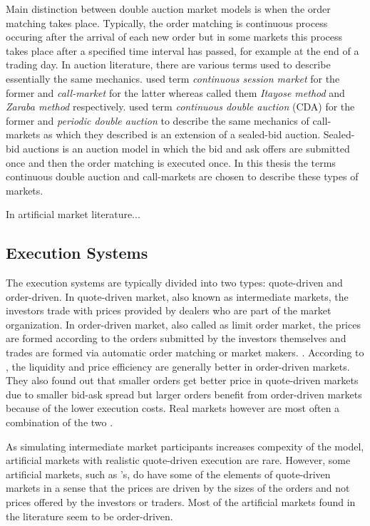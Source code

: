 Main distinction between double auction market models is when
the order matching takes place. Typically, the order matching 
is continuous process occuring after the arrival of each new order but
in some markets this process takes place after a specified time interval
has passed, for example at the end of a trading day. \citep{boer05}
In auction literature, there are various terms used to describe essentially 
the same mechanics. \citet{boer05} used term 
\textit{continuous session market} for the former and \textit{call-market}
for the latter whereas \citet{ASt05} called them \textit{Itayose method}
and \textit{Zaraba method} respectively. \citet{Moc15} used term \textit{continuous 
double auction} (CDA) for the former and \textit{periodic double auction} to describe 
the same mechanics of call-markets as which they described is an extension of 
a sealed-bid auction. Sealed-bid auctions is an auction model in which the bid and ask offers
are submitted once and then the order matching is executed once. In this thesis
the terms continuous double auction and call-markets are chosen to describe
these types of markets.

In artificial market literature...

\subsection{Execution Systems}
The execution systems are typically divided into two types:
quote-driven and order-driven. In quote-driven market, also known
as intermediate markets, the investors trade with prices provided 
by dealers who are part of the market organization. 
In order-driven market, also called as limit order market, 
the prices are formed according to the orders submitted by the 
investors themselves and trades are formed via automatic order matching 
or market makers. \citep{Baru17}. According to \citet{MALINOVA2013104},
the liquidity and price efficiency are generally better in order-driven 
markets. They also found out that smaller orders get better price in 
quote-driven markets due to smaller bid-ask spread 
but larger orders benefit from order-driven markets because of the lower 
execution costs. Real markets however are most often a combination
of the two \citep{boer05}.

As simulating intermediate market participants increases compexity
of the model, artificial markets with realistic quote-driven execution are rare. 
However, some artificial markets, such as \citet{SantaFe99}'s, do have some of 
the elements of quote-driven markets in a sense that the prices are driven by 
the sizes of the orders and not prices offered by the investors or traders. 
Most of the artificial markets found in the literature seem to be order-driven.


